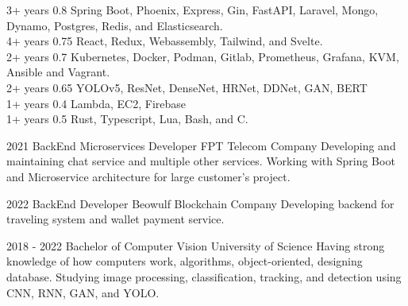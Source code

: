\documentclass[10pt,A4]{article}
\begin{document}
\begin{paracol}{2}
\begin{leftcolumn}
 {3+ years} {0.8} {Spring Boot, Phoenix, Express, Gin, FastAPI, Laravel, Mongo, Dynamo, Postgres, Redis, and Elasticsearch.} \\[-2pt]

 {4+ years} {0.75} {React, Redux, Webassembly, Tailwind, and Svelte.} \\[-2pt]

 {2+ years} {0.7} {Kubernetes, Docker, Podman, Gitlab, Prometheus, Grafana, KVM, Ansible and Vagrant.} \\[-2pt]

 {2+ years} {0.65} {YOLOv5, ResNet, DenseNet, HRNet, DDNet, GAN, BERT} \\[-2pt]

 {1+ years} {0.4} {Lambda, EC2, Firebase} \\[-2pt]

 {1+ years} {0.5} {Rust, Typescript, Lua, Bash, and C.} \\[-2pt]

\end{leftcolumn}
\begin{rightcolumn}

    
\cvevent
    {2021}
    {BackEnd Microservices Developer}
    {FPT Telecom Company}
    {Developing and maintaining chat service and multiple other services. Working with Spring Boot and Microservice architecture for large customer's project.}
    
\cvevent
    {2022}
    {BackEnd Developer}
    {Beowulf Blockchain Company}
    {Developing backend for traveling system and wallet payment service.}

{}

\cvevent
	{2018 - 2022}
	{Bachelor of Computer Vision}
	{University of Science}
	{Having strong knowledge of how computers work, algorithms, object-oriented, designing database. Studying image processing, classification, tracking, and detection using CNN, RNN, GAN, and YOLO.}


\end{rightcolumn}
\end{paracol}
\end{document}
